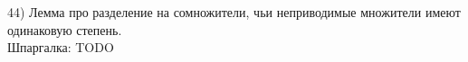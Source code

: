 44) Лемма про разделение на сомножители, чьи неприводимые множители имеют одинаковую степень.\\
Шпаргалка: TODO\\
